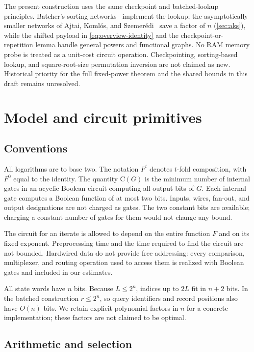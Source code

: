 \documentclass[11pt]{article}
\theoremstyle{definition}
\theoremstyle{remark}
\newcommand{\CC}{\mathrm{C}}
\numberwithin{equation}{section}
\begin{document}
The present construction uses the same checkpoint and batched-lookup
principles.  Batcher's sorting networks~\cite{Batcher68} implement the
lookup; the asymptotically smaller networks of Ajtai, Koml\'os, and
Szemer\'edi~\cite{AKS83} save a factor of $n$ (\cref{sec:aks}), while
the shifted payload in \cref{eq:overview-identity} and the
checkpoint-or-repetition lemma handle general powers and functional graphs.
No RAM memory probe is treated as a unit-cost circuit operation.
Checkpointing, sorting-based lookup, and square-root-size permutation
inversion are not claimed as new.  Historical priority for the full
fixed-power theorem and the shared bounds in this draft remains unresolved.

\section{Model and circuit primitives}\label{sec:model}

\subsection{Conventions}

All logarithms are to base two.  The notation $F^t$ denotes $t$-fold
composition, with $F^0$ equal to the identity.  The quantity $\CC(G)$ is the
minimum number of internal gates in an acyclic Boolean circuit computing
all output bits of $G$.  Each internal gate computes a Boolean function
of at most two bits.  Inputs, wires, fan-out, and output designations are
not charged as gates.  The two constant bits are available; charging a
constant number of gates for them would not change any bound.

The circuit for an iterate is allowed to depend on the entire function
$F$ and on its fixed exponent.  Preprocessing time and the time required
to find the circuit are not bounded.  Hardwired data do not provide free
addressing: every comparison, multiplexer, and routing operation used to
access them is realized with Boolean gates and included in our estimates.

All state words have $n$ bits.  Because $L\leq 2^n$, indices up to $2L$ fit
in $n+2$ bits.  In the batched construction $r\leq 2^n$, so query identifiers
and record positions also have $O(n)$ bits.  We retain explicit polynomial
factors in $n$ for a concrete implementation; these factors are not
claimed to be optimal.

\subsection{Arithmetic and selection}
\end{document}
